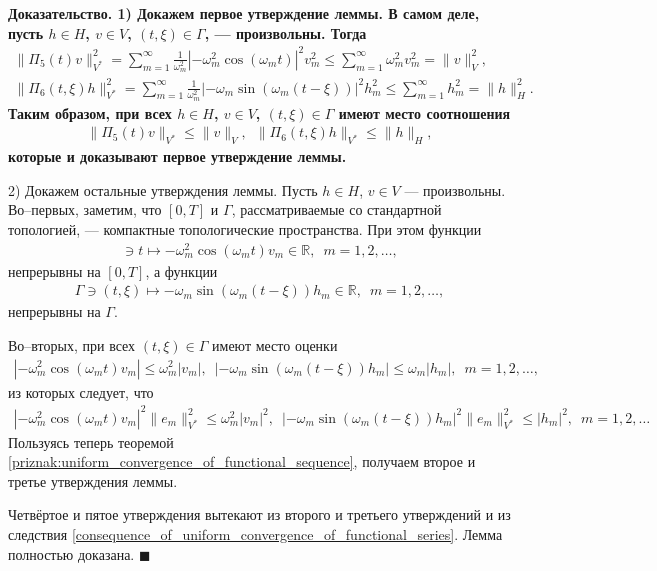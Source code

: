 \documentclass{report}
\newenvironment{Proof}{\par\noindent\bf Доказательство.\rm}{ $\blacksquare$\par}
\begin{document}
\begin{Proof}
1) Докажем первое утверждение леммы. В самом деле, пусть $h\in H$, $v\in V$, $(t,\xi)\in\Gamma$, --- произвольны. Тогда
\begin{gather*}
\|\Pi_5(t)v\|_{V^*}^2=\sum\limits_{m=1}^\infty\frac1{\omega_m^2}|-\omega_m^2\cos(\omega_mt)|^2v_m^2\leqslant\sum\limits_{m=1}^\infty\omega_m^2v_m^2=\|v\|^2_V,\\
\|\Pi_6(t,\xi)h\|_{V^*}^2=\sum\limits_{m=1}^\infty\frac1{\omega_m^2} |-\omega_m\sin(\omega_m(t-\xi))|^2h_m^2\leqslant\sum\limits_{m=1}^\infty h_m^2=\|h\|^2_H.
\end{gather*}
Таким образом, при всех $h\in H$, $v\in V$, $(t,\xi)\in\Gamma$ имеют место соотношения
\begin{gather*}
\|\Pi_5(t)v\|_{V^*}\leqslant\|v\|_V,\,\,\,\|\Pi_6(t,\xi)h\|_{V^*}\leqslant\|h\|_H,
\end{gather*}
которые и доказывают первое утверждение леммы.

2) Докажем остальные утверждения леммы.  Пусть $h\in H$, $v\in V$ --- произвольны. Во--первых, заметим, что $[0,T]$ и $\Gamma$, рассматриваемые со стандартной топологией, --- компактные
топологические пространства. При этом функции
\begin{gather*}
[0,T]\ni t\mapsto-\omega_m^2\cos(\omega_mt)v_m\in\mathbb{R},\,\,\,m=1,2,\dots,
\end{gather*}
непрерывны на $[0,T]$, а  функции
\begin{gather*}
\Gamma\ni(t,\xi)\mapsto-\omega_m\sin(\omega_m(t-\xi))h_m\in\mathbb{R},\,\,\,m=1,2,\dots,
\end{gather*}
непрерывны на $\Gamma$.

Во--вторых, при всех  $(t,\xi)\in\Gamma$ имеют место оценки
\begin{gather*}
|-\omega_m^2\cos(\omega_mt)v_m|\leqslant\omega_m^2|v_m|,\,\,\,|-\omega_m\sin(\omega_m(t-\xi))h_m|\leqslant\omega_m|h_m|,\,\,\,m=1,2,\dots,
\end{gather*}
из которых следует, что
\begin{gather*}
|-\omega_m^2\cos(\omega_mt)v_m|^2\|e_m\|^2_{V^*}\leqslant\omega_m^2|v_m|^2,\,\,\, |-\omega_m\sin(\omega_m(t-\xi))h_m|^2\|e_m\|^2_{V^*}\leqslant|h_m|^2,\,\,\,m=1,2,\dots
\end{gather*}
Пользуясь теперь теоремой \ref{priznak:uniform_convergence_of_functional_sequence}, получаем второе и третье утверждения леммы.

Четвёртое и пятое утверждения вытекают из второго и третьего утверждений и из следствия \ref{consequence_of_uniform_convergence_of_functional_series}. Лемма полностью доказана.
\end{Proof}
\end{document}
